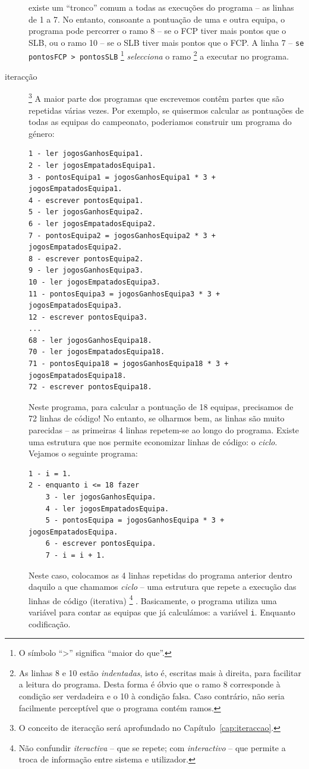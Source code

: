 \begin{description}
existe um ``tronco'' comum a todas as execuções do programa -- as linhas de 1 a 7.
No entanto, consoante a pontuação de uma e outra equipa, o programa pode percorrer o ramo 8 -- se o FCP tiver mais pontos que o SLB, ou o ramo 10 -- se o SLB tiver mais pontos que o FCP.
A linha 7 -- \texttt{se pontosFCP > pontosSLB}%
\footnote{O símbolo ``>'' significa ``maior do que''.}
\emph{selecciona} o ramo%
\footnote{As linhas 8 e 10 estão \emph{indentadas}, isto é, escritas mais à direita, para facilitar a leitura do programa. Desta forma é óbvio que o ramo 8 corresponde à condição ser verdadeira e o 10 à condição falsa. Caso contrário, não seria facilmente perceptível que o programa contém ramos.}
a executar no programa.

\item[iteracção]\footnote{O conceito de iteracção será aprofundado no Capítulo~\ref{cap:iteraccao}.}
A maior parte dos programas que escrevemos contêm partes que são repetidas várias vezes. Por exemplo, se quisermos calcular as pontuações de todas as equipas do campeonato, poderiamos construir um programa do género:
{\small
\begin{verbatim}
1 - ler jogosGanhosEquipa1.
2 - ler jogosEmpatadosEquipa1.
3 - pontosEquipa1 = jogosGanhosEquipa1 * 3 + jogosEmpatadosEquipa1.
4 - escrever pontosEquipa1.
5 - ler jogosGanhosEquipa2.
6 - ler jogosEmpatadosEquipa2.
7 - pontosEquipa2 = jogosGanhosEquipa2 * 3 + jogosEmpatadosEquipa2.
8 - escrever pontosEquipa2.
9 - ler jogosGanhosEquipa3.
10 - ler jogosEmpatadosEquipa3.
11 - pontosEquipa3 = jogosGanhosEquipa3 * 3 + jogosEmpatadosEquipa3.
12 - escrever pontosEquipa3.
...
68 - ler jogosGanhosEquipa18.
70 - ler jogosEmpatadosEquipa18.
71 - pontosEquipa18 = jogosGanhosEquipa18 * 3 + jogosEmpatadosEquipa18.
72 - escrever pontosEquipa18.
\end{verbatim}}
Neste programa, para calcular a pontuação de 18 equipas, precisamos de 72 linhas de código! No entanto, se olharmos bem, as linhas são muito parecidas -- as primeiras 4 linhas repetem-se ao longo do programa. Existe uma estrutura que nos permite economizar linhas de código: o \emph{ciclo}. Vejamos o seguinte programa:
{\small
\begin{verbatim}
1 - i = 1.
2 - enquanto i <= 18 fazer
    3 - ler jogosGanhosEquipa.
    4 - ler jogosEmpatadosEquipa.
    5 - pontosEquipa = jogosGanhosEquipa * 3 + jogosEmpatadosEquipa.
    6 - escrever pontosEquipa.
    7 - i = i + 1.
\end{verbatim}}
Neste caso, colocamos as 4 linhas repetidas do programa anterior dentro daquilo a que chamamos \emph{ciclo} -- uma estrutura que repete a execução das linhas de código (iterativa)%
\footnote{Não confundir \emph{iteractiva} -- que se repete; com \emph{interactivo} -- que permite a troca de informação entre sistema e utilizador.}%
. 
Basicamente, o programa utiliza uma variável para contar as equipas que já calculámos: a variável \texttt{i}. Enquanto 
codificação.

\end{description}



